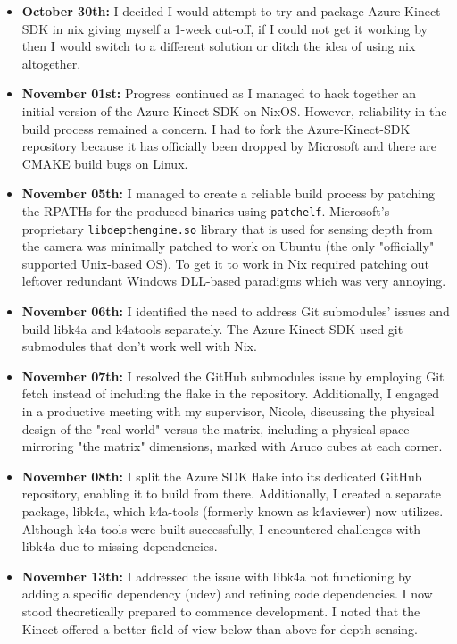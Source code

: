 \begin{itemize}
    \item \textbf{October 30th:} I decided I would attempt to try and package Azure-Kinect-SDK in nix giving myself a 1-week cut-off, if I could not get it working by then I would switch to a different solution or ditch the idea of using nix altogether.

    \item \textbf{November 01st:} Progress continued as I managed to hack together an initial version of the Azure-Kinect-SDK on NixOS. However, reliability in the build process remained a concern. I had to fork the Azure-Kinect-SDK repository because it has officially been dropped by Microsoft and there are CMAKE build bugs on Linux.

    \item \textbf{November 05th:} I managed to create a reliable build process by patching the RPATHs for the produced binaries using \texttt{patchelf}. Microsoft's proprietary \texttt{libdepthengine.so} library that is used for sensing depth from the camera was minimally patched to work on Ubuntu (the only "officially" supported Unix-based OS). To get it to work in Nix required patching out leftover redundant Windows DLL-based paradigms which was very annoying.

    \item \textbf{November 06th:} I identified the need to address Git submodules' issues and build libk4a and k4atools separately. The Azure Kinect SDK used git submodules that don't work well with Nix.

    \item \textbf{November 07th:} I resolved the GitHub submodules issue by employing Git fetch instead of including the flake in the repository. Additionally, I engaged in a productive meeting with my supervisor, Nicole, discussing the physical design of the "real world" versus the matrix, including a physical space mirroring "the matrix" dimensions, marked with Aruco cubes at each corner.

    \item \textbf{November 08th:} I split the Azure SDK flake into its dedicated GitHub repository, enabling it to build from there. Additionally, I created a separate package, libk4a, which k4a-tools (formerly known as k4aviewer) now utilizes. Although k4a-tools were built successfully, I encountered challenges with libk4a due to missing dependencies.

    \item \textbf{November 13th:} I addressed the issue with libk4a not functioning by adding a specific dependency (udev) and refining code dependencies. I now stood theoretically prepared to commence development. I noted that the Kinect offered a better field of view below than above for depth sensing.


\end{itemize}
